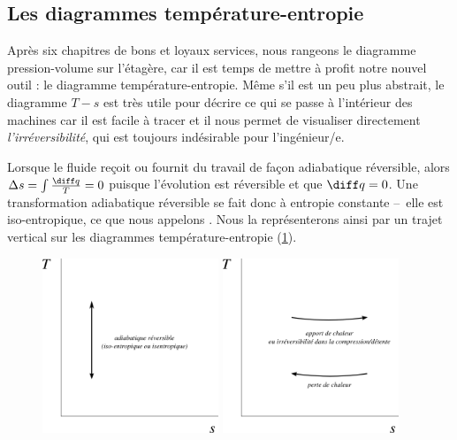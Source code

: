 	
	\subsection{Les diagrammes température-entropie}
	
		Après six chapitres de bons et loyaux services, nous rangeons le diagramme pression-volume sur l’étagère, car il est temps de mettre à profit notre nouvel outil : le diagramme température-entropie. Même s’il est un peu plus abstrait, le diagramme $T-s$ est très utile pour décrire ce qui se passe à l’intérieur des machines car il est facile à tracer et il nous permet de visualiser directement \emph{l’irréversibilité}, qui est toujours indésirable pour l’ingénieur/e.

		Lorsque le fluide reçoit ou fournit du travail de façon adiabatique réversible, alors $\Delta s = \int \frac{\diff q}{T} = 0$ puisque l’évolution est réversible et que $\diff q = 0$. Une transformation adiabatique réversible se fait donc à entropie constante --\ elle est iso-entropique, ce que nous appelons . Nous la représenterons ainsi par un trajet vertical sur les diagrammes température-entropie (\cref{fig_ts_basics}).

		\begin{figure}
			\begin{center}
				\includegraphics[width=0.47\textwidth]{images/ts_basics_1.png}
				\includegraphics[width=0.47\textwidth]{images/ts_basics_2.png}
			\end{center}
			\label{fig_ts_basics}
		\end{figure}

